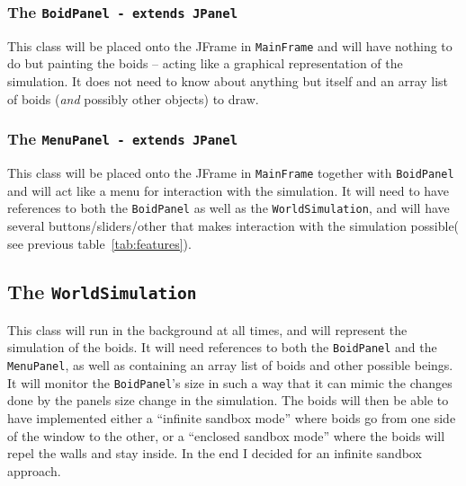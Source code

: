 \documentclass[a4paper,twoside, 10pt]{report}
\newcommand{\code}[1]{\texttt{#1}}
\begin{document}
\subsubsection{The \code{BoidPanel - extends JPanel}}
\label{subsubsec:BoidPanel}
This class will be placed onto the JFrame in \code{MainFrame} and will have nothing to do but painting the boids -- acting like a graphical representation of the simulation. It does not need to know about anything but itself and an array list of boids (\textit{and} possibly other objects) to draw.

\subsubsection{The \code{MenuPanel - extends JPanel}}
\label{subsubsec:MenuPanel}
This class will be placed onto the JFrame in \code{MainFrame} together with \code{BoidPanel} and will act like a menu for interaction with the simulation. It will need to have references to both the \code{BoidPanel} as well as the \code{WorldSimulation}, and will have several buttons/sliders/other that makes interaction with the simulation possible( see previous table~\ref{tab:features}).

\subsection{The \code{WorldSimulation}}
\label{subsec:WorldSimulation}
This class will run in the background at all times, and will represent the simulation of the boids. It will need references to both the \code{BoidPanel} and the \code{MenuPanel}, as well as containing an array list of boids and other possible beings. It will monitor the \code{BoidPanel}'s size in such a way that it can mimic the changes done by the panels size change in the simulation. The boids will then be able to have implemented either a ``infinite sandbox mode'' where boids go from one side of the window to the other, or a ``enclosed sandbox mode'' where the boids will repel the walls and stay inside. In the end I decided for an infinite sandbox approach.
\end{document}
